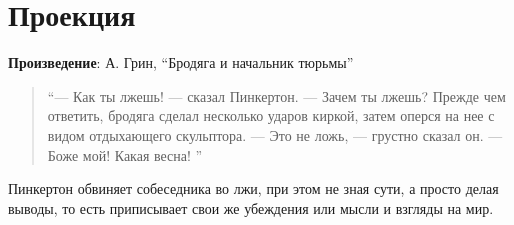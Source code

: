 \section{Проекция}

\textbf{Произведение}: А. Грин, “Бродяга и начальник тюрьмы”

\begin{quote}
    “— Как ты лжешь! — сказал Пинкертон. — Зачем ты лжешь?
Прежде чем ответить, бродяга сделал несколько ударов киркой, затем оперся на нее с видом отдыхающего скульптора.
— Это не ложь, — грустно сказал он. — Боже мой! Какая весна! ”
\end{quote}

Пинкертон обвиняет собеседника во лжи, при этом не зная сути, а просто делая выводы, то есть приписывает свои же убеждения или мысли и взгляды на мир. 
